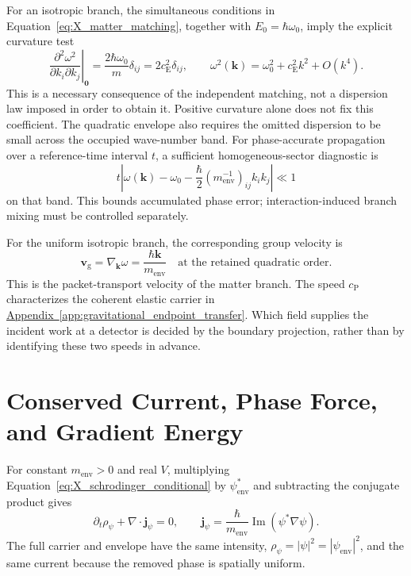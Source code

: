 For an isotropic branch, the simultaneous conditions in Equation~\eqref{eq:X_matter_matching}, together with $E_0=\hbar\omega_0$, imply the explicit curvature test
\[
 \left.\frac{\partial^2\omega^2}
 {\partial k_i\partial k_j}\right|_{\mathbf0}
 =\frac{2\hbar\omega_0}{m}\delta_{ij}
 =2c_{\mathrm E}^2\delta_{ij},
 \qquad
 \omega^2(\mathbf k)=\omega_0^2+c_{\mathrm E}^2k^2+O(k^4).
\]
This is a necessary consequence of the independent matching, not a dispersion law imposed in order to obtain it. Positive curvature alone does not fix this coefficient. The quadratic envelope also requires the omitted dispersion to be small across the occupied wave-number band. For phase-accurate propagation over a reference-time interval $t$, a sufficient homogeneous-sector diagnostic is
\[
 t\left|\omega(\mathbf k)-\omega_0
 -\frac{\hbar}{2}(m_{\mathrm{env}}^{-1})_{ij}k_i k_j\right|\ll1
\]
on that band. This bounds accumulated phase error; interaction-induced branch mixing must be controlled separately.

For the uniform isotropic branch, the corresponding group velocity is
\begin{equation}
    \mathbf v_{\mathrm g}
    =\nabla_{\mathbf k}\omega
    =\frac{\hbar\mathbf k}{m_{\mathrm{env}}}
    \quad\text{at the retained quadratic order}.
\end{equation}
This is the packet-transport velocity of the matter branch. The speed $c_{\mathrm P}$ characterizes the coherent elastic carrier in \hyperref[app:gravitational_endpoint_transfer]{Appendix~\ref*{app:gravitational_endpoint_transfer}}. Which field supplies the incident work at a detector is decided by the boundary projection, rather than by identifying these two speeds in advance.

\section{Conserved Current, Phase Force, and Gradient Energy}

For constant $m_{\mathrm{env}}>0$ and real $V$, multiplying Equation~\eqref{eq:X_schrodinger_conditional} by $\psi_{\mathrm{env}}^*$ and subtracting the conjugate product gives
\begin{equation}
    \boxed{
    \partial_t\rho_\psi+\nabla\cdot\mathbf j_\psi=0,
    \qquad
    \mathbf j_\psi=\frac{\hbar}{m_{\mathrm{env}}}
    \operatorname{Im}(\psi^*\nabla\psi)
    }.
    \label{eq:X_continuity}
\end{equation}
The full carrier and envelope have the same intensity,
$\rho_\psi=|\psi|^2=|\psi_{\mathrm{env}}|^2$, and the same current because the removed phase is spatially uniform.


